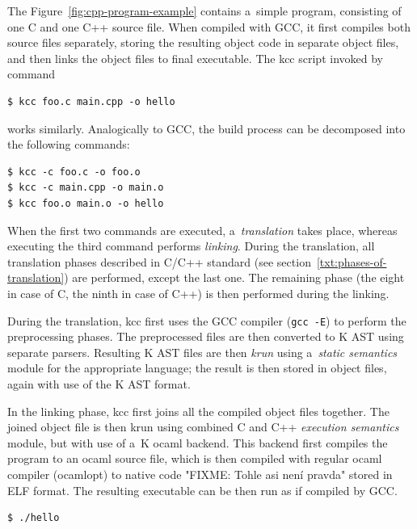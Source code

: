 \documentclass[nolot,nolof,nocover,printed]{fithesis3}
\begin{document}
The Figure~\ref{fig:cpp-program-example} contains a~simple program, consisting of one C and one C++ source file. When compiled with GCC, it first compiles both source files separately, storing the resulting object code in separate object files, and then links the object files to final executable. The kcc script invoked by command
\begin{lstlisting}
$ kcc foo.c main.cpp -o hello
\end{lstlisting}
works similarly. Analogically to GCC, the build process can be decomposed into the following commands:
\begin{lstlisting}
$ kcc -c foo.c -o foo.o
$ kcc -c main.cpp -o main.o
$ kcc foo.o main.o -o hello
\end{lstlisting}

When the first two commands are executed, a~\textit{translation} takes place, whereas executing the third command performs \textit{linking}. During the translation, all translation phases described in C/C++ standard (see section~\ref{txt:phases-of-translation}) are performed, except the last one. The remaining phase (the eight in case of C, the ninth in case of C++) is then performed during the linking.

During the translation, kcc first uses the GCC compiler (\lstinline|gcc -E|) to perform the preprocessing phases. The preprocessed files are then converted to K AST using separate parsers. Resulting K AST files are then \textit{krun} using a~\textit{static semantics} module for the appropriate language; the result is then stored in object files, again with use of the K AST format.

In the linking phase, kcc first joins all the compiled object files together. The joined object file is then krun using combined C and C++ \textit{execution semantics} module, but with use of a~K ocaml backend. This backend first compiles the program to an ocaml source file, which is then compiled with regular ocaml compiler (ocamlopt) to native code "FIXME: Tohle asi není pravda" stored in ELF format. The resulting executable can be then run as if compiled by GCC.

\begin{lstlisting}
$ ./hello
\end{lstlisting}


\end{document}
